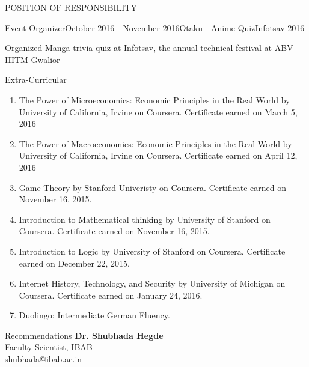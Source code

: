 \documentclass{resume} %
\begin{document}
\begin{rSection}{POSITION OF RESPONSIBILITY}

\begin{rSubsection}{Event Organizer}{October 2016 - November 2016}{Otaku - Anime Quiz}{Infotsav 2016}
\item Organized Manga trivia quiz at Infotsav, the annual technical festival at ABV-IIITM Gwalior 

\end{rSubsection}







\end{rSection}
\begin{rSection}{Extra-Curricular} \itemsep -3pt
\begin{enumerate}
\item The Power of Microeconomics: Economic Principles in the Real World by University of California, Irvine on Coursera. Certificate earned on March 5, 2016
\item The Power of Macroeconomics: Economic Principles in the Real World by University of California, Irvine on Coursera. Certificate earned on April 12, 2016
\item Game Theory by Stanford Univeristy on Coursera. Certificate earned on November 16, 2015.
\item Introduction to Mathematical thinking by University of Stanford on Coursera. Certificate earned on November 16, 2015.
\item Introduction to Logic by University of Stanford on Coursera. Certificate earned on December 22, 2015.
\item Internet History, Technology, and Security by University of Michigan on Coursera. Certificate earned on January 24, 2016.
\item Duolingo: Intermediate German Fluency.
\end{enumerate}
\end{rSection}
\begin{rSection}{Recommendations}
\textbf{Dr. Shubhada Hegde} \\
Faculty Scientist, IBAB\\
shubhada@ibab.ac.in
\end{rSection}
\end{document}
